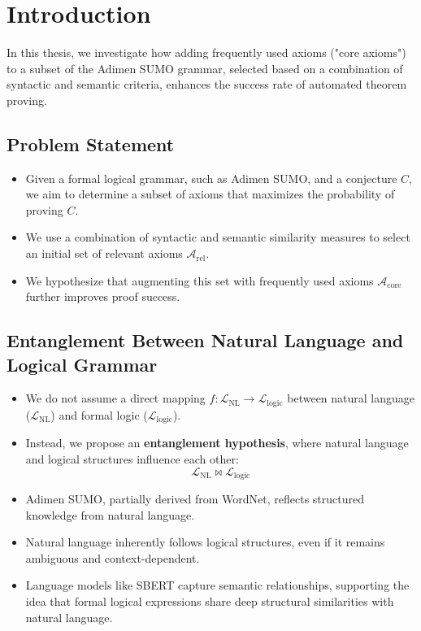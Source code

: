 \documentclass[english,version-2020-11]{uzl-thesis}
\begin{document}
%
%


\section{Introduction}

In this thesis, we investigate how adding frequently used axioms ("core axioms") to a subset of the Adimen SUMO grammar, selected based on a combination of syntactic and semantic criteria, enhances the success rate of automated theorem proving.

\subsection{Problem Statement}
\begin{itemize}
    \item Given a formal logical grammar, such as Adimen SUMO, and a conjecture $C$, we aim to determine a subset of axioms that maximizes the probability of proving $C$.
    \item We use a combination of syntactic and semantic similarity measures to select an initial set of relevant axioms $\mathcal{A}_{\text{rel}}$.
    \item We hypothesize that augmenting this set with frequently used axioms $\mathcal{A}_{\text{core}}$ further improves proof success.
\end{itemize}

\subsection{Entanglement Between Natural Language and Logical Grammar}
\begin{itemize}
    \item We do not assume a direct mapping $f: \mathcal{L}_{\text{NL}} \to \mathcal{L}_{\text{logic}}$ between natural language ($\mathcal{L}_{\text{NL}}$) and formal logic ($\mathcal{L}_{\text{logic}}$).
    \item Instead, we propose an \textbf{entanglement hypothesis}, where natural language and logical structures influence each other:
    \begin{equation}
        \mathcal{L}_{\text{NL}} \bowtie \mathcal{L}_{\text{logic}}
    \end{equation}
    \item Adimen SUMO, partially derived from WordNet, reflects structured knowledge from natural language.
    \item Natural language inherently follows logical structures, even if it remains ambiguous and context-dependent.
    \item Language models like SBERT capture semantic relationships, supporting the idea that formal logical expressions share deep structural similarities with natural language.
\end{itemize}
\end{document}
